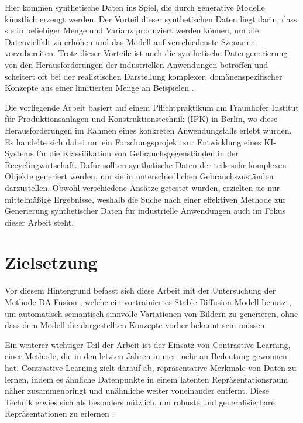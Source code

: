 Hier kommen synthetische Daten ins Spiel, die durch generative Modelle künstlich erzeugt werden. Der Vorteil dieser synthetischen Daten liegt darin, dass sie in beliebiger Menge und Varianz produziert werden können, um die Datenvielfalt zu erhöhen und das Modell auf verschiedenste Szenarien vorzubereiten. Trotz dieser Vorteile ist auch die synthetische Datengenerierung von den Herausforderungen der industriellen Anwendungen betroffen und scheitert oft bei der realistischen Darstellung komplexer, domänenspezifischer Konzepte aus einer limitierten Menge an Beispielen \parencite{Lu2024syntheticdatareview}.

Die vorliegende Arbeit basiert auf einem Pflichtpraktikum am Fraunhofer Institut für Produktionsanlagen und Konstruktionstechnik (IPK) in Berlin, wo diese Herausforderungen im Rahmen eines konkreten Anwendungsfalls erlebt wurden. Es handelte sich dabei um ein Forschungsprojekt zur Entwicklung eines KI-Systems für die Klassifikation von Gebrauchsgegenständen in der Recyclingwirtschaft. Dafür sollten synthetische Daten der teils sehr komplexen Objekte generiert werden, um sie in unterschiedlichen Gebrauchszuständen darzustellen. Obwohl verschiedene Ansätze getestet wurden, erzielten sie nur mittelmäßige Ergebnisse, weshalb die Suche nach einer effektiven Methode zur Generierung synthetischer Daten für industrielle Anwendungen auch im Fokus dieser Arbeit steht.

\section{Zielsetzung} \label{sec:goal}

Vor diesem Hintergrund befasst sich diese Arbeit mit der Untersuchung der Methode DA-Fusion \parencite{Trabucco2023dafusion}, welche ein vortrainiertes Stable Diffusion-Modell benutzt, um automatisch semantisch sinnvolle Variationen von Bildern zu generieren, ohne dass dem Modell die dargestellten Konzepte vorher bekannt sein müssen.

Ein weiterer wichtiger Teil der Arbeit ist der Einsatz von Contrastive Learning, einer Methode, die in den letzten Jahren immer mehr an Bedeutung gewonnen hat. Contrastive Learning zielt darauf ab, repräsentative Merkmale von Daten zu lernen, indem es ähnliche Datenpunkte in einem latenten Repräsentationsraum näher zusammenbringt und unähnliche weiter voneinander entfernt. Diese Technik erwies sich als besonders nützlich, um robuste und generalisierbare Repräsentationen zu erlernen \parencite{Liu2021understandimprovecontrastivelearning}.

